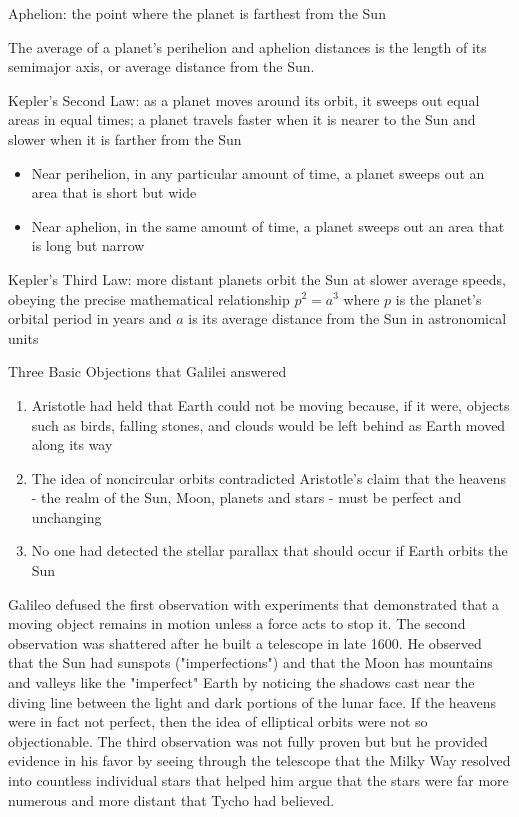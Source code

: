 \documentclass[12pt]{article}
\begin{document}
\begin{definition} Aphelion: the point where the planet is farthest from the Sun \end{definition} 
The average of a planet's perihelion and aphelion distances is the length of its semimajor axis, or average distance from the Sun. 
\begin{definition} Kepler's Second Law: as a planet moves around its orbit, it sweeps out equal areas in equal times; a planet travels faster when it is nearer to the Sun and slower when it is farther from the Sun \begin{itemize} 
\item Near perihelion, in any particular amount of time, a planet sweeps out an area that is short but wide
\item Near aphelion, in the same amount of time, a planet sweeps out an area that is long but narrow
\end{itemize} \end{definition} 
\begin{definition} Kepler's Third Law: more distant planets orbit the Sun at slower average speeds, obeying the precise mathematical relationship $p^2 = a^3$ where $p$ is the planet's orbital period in years and $a$ is its average distance from the Sun in astronomical units \end{definition} 
Three Basic Objections that Galilei answered \begin{enumerate} 
\item Aristotle had held that Earth could not be moving because, if it were, objects such as birds, falling stones, and clouds would be left behind as Earth moved along its way
\item The idea of noncircular orbits contradicted Aristotle's claim that the heavens - the realm of the Sun, Moon, planets and stars - must be perfect and unchanging
\item No one had detected the stellar parallax that should occur if Earth orbits the Sun \end{enumerate} 
Galileo defused the first observation with experiments that demonstrated that a moving object remains in motion unless a force acts to stop it. The second observation was shattered after he built a telescope in late 1600. He observed that the Sun had sunspots ("imperfections") and that the Moon has mountains and valleys like the "imperfect" Earth by noticing the shadows cast near the diving line between the light and dark portions of the lunar face. If the heavens were in fact not perfect, then the idea of elliptical orbits were not so objectionable. The third observation was not fully proven but but he provided evidence in his favor by seeing through the telescope that the Milky Way resolved into countless individual stars that helped him argue that the stars were far more numerous and more distant that Tycho had believed. \\~\\
\end{document}
